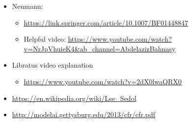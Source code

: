 \documentclass[
]{article}
\begin{document}
\begin{itemize}
  \begin{itemize}
  \item
    \href{https://search.lib.utexas.edu/discovery/openurl?institution=01UTAU_INST&vid=01UTAU_INST:SEARCH&rft.aulast=Nash&rft.volume=54&url_ver=Z39.88-2004&rft_id=info:doi\%2F10.2307\%2F1969529&rft.date=1951&rft.spage=286&rft.jtitle=Ann.\%20Math.&rft.aufirst=J.&rft.atitle=Non-Cooperative\%20Games&rft.title=Ann.\%20Math}{\ul{https://search.lib.utexas.edu/discovery/openurl?institution=01UTAU\_INST\&vid=01UTAU\_INST:SEARCH\&rft.aulast=Nash\&rft.volume=54\&url\_ver=Z39.88-2004\&rft\_id=info:doi\%2F10.2307\%2F1969529\&rft.date=1951\&rft.spage=286\&rft.jtitle=Ann.\%20Math.\&rft.aufirst=J.\&rft.atitle=Non-Cooperative\%20Games\&rft.title=Ann.\%20Math}}.
  \item
    \href{https://www.jstor.org/stable/1969529?origin=crossref&seq=1}{\ul{https://www.jstor.org/stable/1969529?origin=crossref\&seq=1}}
  \end{itemize}
\item
  Neumann:

  \begin{itemize}
  \item
    \href{https://link.springer.com/article/10.1007/BF01448847}{\ul{https://link.springer.com/article/10.1007/BF01448847}}
  \item
    Helpful video:
    \href{https://www.youtube.com/watch?v=NrJpVhuieK4&ab_channel=AbdelazizBahnasy}{\ul{https://www.youtube.com/watch?v=NrJpVhuieK4\&ab\_channel=AbdelazizBahnasy}}
  \end{itemize}
\item
  Libratus video explanation

  \begin{itemize}
  \item
    \href{https://www.youtube.com/watch?v=2dX0lwaQRX0}{\ul{https://www.youtube.com/watch?v=2dX0lwaQRX0}}
  \end{itemize}
\item
  \href{https://en.wikipedia.org/wiki/Lee_Sedol}{\ul{https://en.wikipedia.org/wiki/Lee\_Sedol}}
\item
  \href{http://modelai.gettysburg.edu/2013/cfr/cfr.pdf}{\ul{http://modelai.gettysburg.edu/2013/cfr/cfr.pdf}}
\end{itemize}
\end{document}
